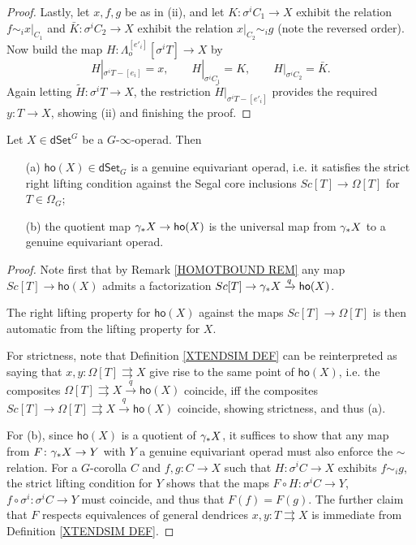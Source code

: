 \documentclass[a4paper,10pt
,draft
]{article}%
\renewcommand{\1}{\ensuremath{\mathbb{id}}}
\begin{document}
\begin{proof}
Lastly, let $x,f,g$ be as in (ii), 
and let
$K \colon \sigma^i C_1 \to X$ exhibit the relation
$f \sim_i x|_{C_1}$
and 
$ \bar{K} \colon \sigma^i C_2 \to X$
exhibit the relation
$x|_{C_2} \sim_i g$ (note the reversed order).
Now build the map
$H \colon \Lambda_o^{[e'_i]}[\sigma^i T] \to X$ by
\[
	H|_{\sigma^i T - [e_i]} = x,
\qquad
	H|_{\sigma^i C_1} = K,
\qquad
	H|_{\sigma^i C_2} = \bar{K}.
\]
Again letting 
$\widetilde{H} \colon \sigma^i T \to X$,
the restriction 
$\widetilde{H}|_{\sigma^i T - [e'_i]}$
provides the required $y \colon T \to X$,
showing (ii) and finishing the proof.
\end{proof}


\begin{corollary}
Let $X \in \mathsf{dSet}^G$ be a $G$-$\infty$-operad. Then
	\begin{itemize}
	\item[(a)] $\mathsf{ho}(X)\in \mathsf{dSet}_G$ is a genuine equivariant operad, i.e. it satisfies the strict right lifting condition against the Segal core inclusions
	$Sc[T] \to \Omega[T]$ for $T \in \Omega_G$;
	\item[(b)] the quotient map
	$\gamma_{\**}X \to \mathsf{ho}(X)$ is the universal map from $\gamma_{\**}X$ to a genuine equivariant operad.
	\end{itemize}
\end{corollary}

\begin{proof}
	Note first that by Remark \ref{HOMOTBOUND REM}
	any map 	$Sc[T] \to \mathsf{ho}(X)$ admits a factorization 
	$Sc[T] \to \gamma_{\**}X \xrightarrow{q} \mathsf{ho}(X)$.
	
	The right lifting property for $\mathsf{ho}(X)$
	against the maps $Sc[T] \to \Omega[T]$
	is then automatic from the lifting property for $X$.

	For strictness,	
	note that Definition \ref{XTENDSIM DEF}
	can be reinterpreted as saying that
	$x,y \colon \Omega[T] \rightrightarrows X$
	give rise to the same point of 
	$\mathsf{ho}(X)$, i.e. 
	the composites 
	$\Omega[T] \rightrightarrows X \xrightarrow{q}
	\mathsf{ho}(X)$ coincide, 
	iff the composites 
	$Sc[T] \to \Omega[T] \rightrightarrows X \xrightarrow{q}
	\mathsf{ho}(X)$ coincide, showing strictness, and thus (a).
		
	For (b), since $\mathsf{ho}(X)$ is a quotient of
	$\gamma_{\**} X$, it suffices to show that any map
	from $F \colon \gamma_{\**}X \to Y$ with $Y$ a genuine equivariant operad must also enforce the $\sim$ relation.
	For a $G$-corolla $C$ and
	$f,g\colon C \to X$ such that 
	$H \colon \sigma^i C \to X$ exhibits
	$f \sim_i g$, 
	the strict lifting condition for $Y$
	shows that the maps
	$F\circ H \colon \sigma^i C \to Y$,
	$f \circ \sigma^i \colon \sigma^i C \to Y$
	must coincide, and thus that
	$F(f)=F(g)$.
	The further claim that $F$ respects equivalences
	of general dendrices $x,y\colon T \rightrightarrows X$
	is immediate from Definition \ref{XTENDSIM DEF}.
\end{proof}
\end{document}
